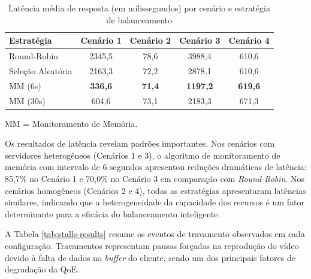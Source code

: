 \begin{table}[htbp]
\centering
\begin{threeparttable}
\caption{Latência média de resposta (em milissegundos) por cenário e estratégia de balanceamento}
\label{tab:latency-results}
\small
\begin{tabular}{|l|c|c|c|c|}
\hline
\textbf{Estratégia} & \textbf{Cenário 1} & \textbf{Cenário 2} & \textbf{Cenário 3} & \textbf{Cenário 4} \\
\hline
Round-Robin & 2345,5 & 78,6 & 3988,4 & 610,6 \\
\hline
Seleção Aleatória & 2163,3 & 72,2 & 2878,1 & 610,6 \\
\hline
MM (6s) & \textbf{336,6} & \textbf{71,4} & \textbf{1197,2} & \textbf{619,6} \\
\hline
MM (30s) & 604,6 & 73,1 & 2183,3 & 671,3 \\
\hline
\end{tabular}

\begin{tablenotes}
\footnotesize
\item MM = Monitoramento de Memória.
\end{tablenotes}

\end{threeparttable}
\end{table}


Os resultados de latência revelam padrões importantes. Nos cenários com servidores heterogêneos (Cenários 1 e 3), o algoritmo de monitoramento de memória com intervalo de 6 segundos apresentou reduções dramáticas de latência: 85,7\% no Cenário 1 e 70,0\% no Cenário 3 em comparação com \textit{Round-Robin}. Nos cenários homogêneos (Cenários 2 e 4), todas as estratégias apresentaram latências similares, indicando que a heterogeneidade da capacidade dos recursos é um fator determinante para a eficácia do balanceamento inteligente.

A Tabela \ref{tab:stalls-results} resume os eventos de travamento observados em cada configuração. Travamentos representam pausas forçadas na reprodução do vídeo devido à falta de dados no \textit{buffer} do cliente, sendo um dos principais fatores de degradação da QoE.

